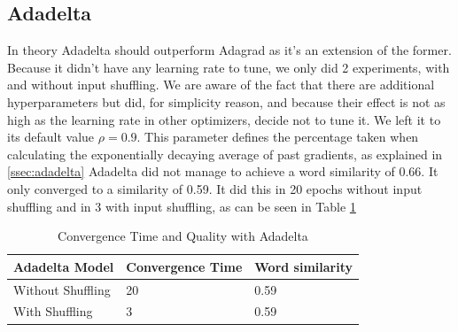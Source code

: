 \subsection{Adadelta}
In theory Adadelta \cite{adadelta} should outperform Adagrad as it's an extension of the former. Because it didn't have any learning rate to tune, we only did 2 experiments, with and without input shuffling. We are aware of the fact that there are additional hyperparameters but did, for simplicity reason, and because their effect is not as high as the learning rate in other optimizers, decide not to tune it. We left it to its default value $\rho = 0.9$. This parameter defines the percentage taken when calculating the exponentially decaying average of past gradients, as explained in \ref{ssec:adadelta} Adadelta did not manage to achieve a word similarity of 0.66. It only converged to a similarity of 0.59. It did this in 20 epochs without input shuffling and in 3 with input shuffling, as can be seen in Table \ref{table:results_adadelta}
\begin{table}[h]
\centering
\begin{tabular}{|l|l|l|}
\hline
Adadelta Model & Convergence Time & Word similarity \\ \hline
Without Shuffling & 20 & 0.59 \\ \hline
With Shuffling & 3 & 0.59 \\ \hline
\end{tabular}
\caption{Convergence Time and Quality with Adadelta}
\label{table:results_adadelta}
\end{table}


